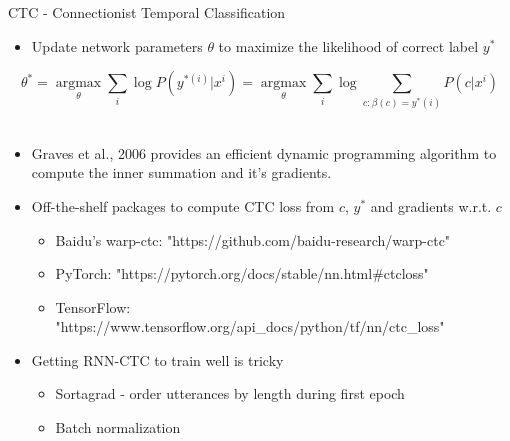 \documentclass[10pt]{beamer}
\begin{document}
\begin{frame}[fragile]{CTC - Connectionist Temporal Classification}
\begin{itemize}
	\item Update network parameters $\theta$ to maximize the likelihood of correct label $y^{*}$
\end{itemize}
$$\theta^{*} =  \operatorname*{argmax}_{\theta} \sum_{i}^{} \log P(y^{*(i)}|x^{i}) = \operatorname*{argmax}_{\theta} \sum_{i}^{} \log \sum_{c:\beta(c)=y^{*}(i)}^{}P(c|x^{i})$$ \\
\begin{itemize}
	\item Graves et al., 2006 provides an efficient dynamic programming algorithm to compute the inner summation and it's gradients.
	\item Off-the-shelf packages to compute CTC loss from $c$, $y^{*}$ and gradients w.r.t. $c$
	\begin{itemize}
		\item Baidu's warp-ctc: "https://github.com/baidu-research/warp-ctc"
		\item PyTorch: "https://pytorch.org/docs/stable/nn.html\#ctcloss"
		\item TensorFlow: "https://www.tensorflow.org/api\_docs/python/tf/nn/ctc\_loss"
	\end{itemize}
	\item Getting RNN-CTC to train well is tricky
	\begin{itemize}
		\item Sortagrad - order utterances by length during first epoch
		\item Batch normalization
	\end{itemize}
\end{itemize}


\end{frame}


\end{document}
